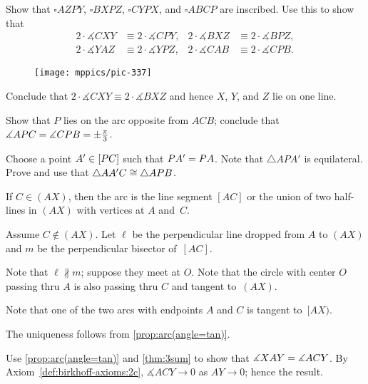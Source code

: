 Show that $\square AZPY$, $\square BXPZ$, $\square CYPX$, and $\square ABCP$ are inscribed.
Use this to show that
\begin{align*}
2\cdot \measuredangle CXY&\equiv 2\cdot \measuredangle CPY,
&
2\cdot \measuredangle BXZ&\equiv 2\cdot \measuredangle BPZ,
\\
2\cdot \measuredangle YAZ&\equiv 2\cdot \measuredangle YPZ,
&
2\cdot \measuredangle CAB&\equiv 2\cdot \measuredangle CPB.
\end{align*}

{

\begin{wrapfigure}[8]{r}{25mm}
\vskip-2mm
\centering
\texttt{[image: mppics/pic-337]}
\end{wrapfigure}

Conclude that 
$2\cdot \measuredangle CXY\equiv 2\cdot \measuredangle BXZ$
and hence $X$, $Y$, and $Z$ lie on one line.




Show that $P$ lies on the arc opposite from $ACB$;
conclude that
$\measuredangle APC=\measuredangle CPB=\pm\tfrac\pi3$.

}

Choose a point $A'\in [PC]$ such that $PA'=PA$.
Note that $\triangle APA'$ is equilateral.
Prove and use that $\triangle AA'C\cong \triangle APB$.

If $C\in (AX)$, then the arc is the line segment $[AC]$ or the union of two half-lines in $(AX)$ with vertices at $A$ and~$C$.


Assume $C\notin (AX)$.
Let $\ell$ be the perpendicular line dropped from $A$ to $(AX)$ and $m$ be the perpendicular bisector of~$[AC]$.

Note that $\ell\nparallel m$;
suppose they meet at $O$.
Note that the circle with center $O$ passing thru $A$ is also passing thru $C$ and tangent to~$(AX)$.


Note that one of the two arcs with endpoints $A$ and $C$ is tangent to~$[AX)$.

The uniqueness follows from \ref{prop:arc(angle=tan)}.

 Use \ref{prop:arc(angle=tan)} and \ref{thm:3sum} to show that 
$\measuredangle XAY=\measuredangle ACY$.
By Axiom~\ref{def:birkhoff-axioms:2c}, $\measuredangle ACY\to 0$ as $AY\to 0$;
hence the result.

